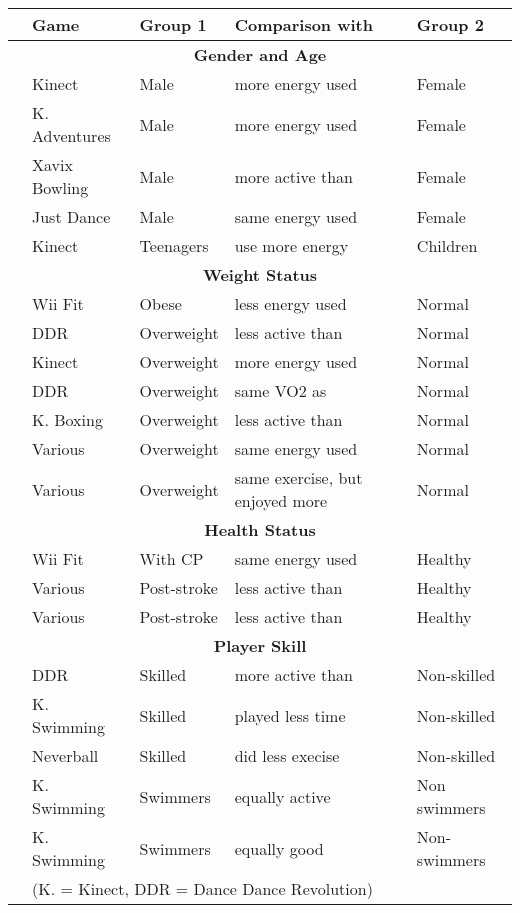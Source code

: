 
\begin{tabularx}{\linewidth}{@{}l@{}llXl@{}}
\hline
& \textbf{Game} & \textbf{Group 1} & \textbf{Comparison with} & \textbf{Group 2} \\
\hline 

\multicolumn{5}{c}{\textbf{Gender and Age}}\\
\cite{Clevenger2015EnergyKinect}&Kinect&Male&more energy used&Female\\
\cite{McNarry2016InvestigatingChildren}&K. Adventures&Male&more energy used&Female\\
\cite{Lam2011PlayAlternatives}&Xavix Bowling&Male&more active than&Female\\
\cite{Lin2015JustOutcomes}&Just Dance&Male&same energy used&Female\\
\cite{Clevenger2015EnergyKinect}&Kinect&Teenagers&use more energy&Children\\
\multicolumn{5}{c}{\textbf{Weight Status}}\\
\cite{ODonovan2014TheWeight}&Wii Fit&Obese&less energy used&Normal\\
\cite{Pope2016EffectsRevolution}&DDR&Overweight&less active than&Normal\\
\cite{Clevenger2015EnergyKinect}&Kinect&Overweight&more energy used&Normal\\
\cite{Unnithan2006EvaluationAdolescents}&DDR&Overweight&same VO2 as&Normal\\
\cite{Chaput2016LeanOnes}&K. Boxing&Overweight&less active than&Normal\\
\cite{Lau2015EvaluatingChildren}&Various&Overweight&same energy used&Normal\\
\cite{Bailey2011EnergyExergaming}&Various&Overweight&same exercise, but enjoyed more&Normal\\
\multicolumn{5}{c}{\textbf{Health Status}}\\
\cite{Robert2013ExerciseConsole}&Wii Fit&With CP&same energy used&Healthy\\
\cite{Kafri2014EnergyPoststroke}&Various&Post-stroke&less active than&Healthy\\
\cite{Neil2013SonyRehabilitation}&Various&Post-stroke&less active than&Healthy\\
\multicolumn{5}{c}{\textbf{Player Skill}}\\
\cite{Sell2008EnergyExperience}&DDR&Skilled&more active than&Non-skilled\\
\cite{Soltani2017PhysiologicalExperience}&K. Swimming&Skilled&played less time&Non-skilled\\
\cite{Berkovsky2012PhysicalReward}&Neverball&Skilled&did less execise&Non-skilled\\
\cite{Soltani2017PhysiologicalExperience}&K. Swimming&Swimmers&equally active&Non swimmers\\
\cite{Soltani_2016}&K. Swimming&Swimmers&equally good&Non-swimmers\\

\hline
& \multicolumn{4}{l}{(K. = Kinect, DDR = Dance Dance Revolution)
}
\end{tabularx}
\vspace{-.7cm}
